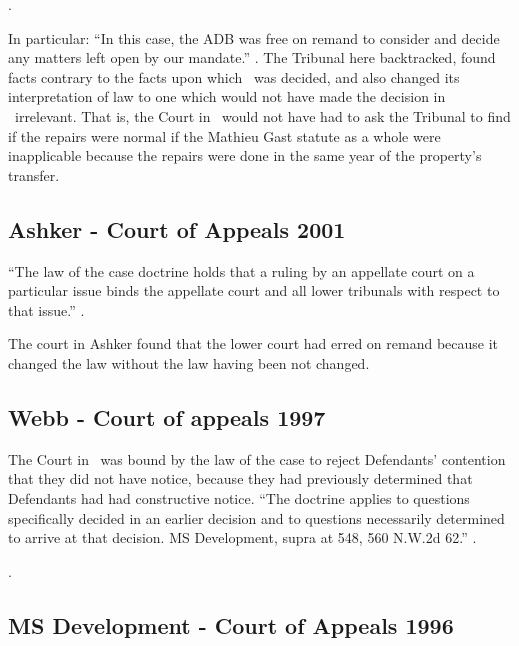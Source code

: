 \documentclass[12pt,\documentclassflag]{michiganCourtOfAppealsBrief}
\begin{document}
.

In particular: ``In this case, the ADB was free on remand to consider and decide any matters left open by our mandate.'' . The Tribunal here backtracked, found facts contrary to the facts upon which \cite{Patru 1}\ was decided, and also changed its interpretation of law to one which would not have made the decision in \cite{Patru 1}\ irrelevant. That is, the Court in \cite{Patru 1}\ would not have had to ask the Tribunal to find if the repairs were normal if the Mathieu Gast statute as a whole were inapplicable because the repairs were done in the same year of the property's transfer.


\subsection{Ashker - Court of Appeals 2001}
``The law of the case doctrine holds that a ruling by an appellate court on a particular issue binds the appellate court and all lower tribunals with respect to that issue.'' .

The court in Ashker found that the lower court had erred on remand because it changed the law without the law having been not changed.

\subsection{Webb - Court of appeals 1997}


The Court in \cite{Webb}\ was bound by the law of the case to reject Defendants' contention that they did not have notice, because they had previously determined that Defendants had had constructive notice. 
``The doctrine applies to questions specifically decided in an earlier decision and to questions necessarily determined to arrive at that decision. MS Development, supra at 548, 560 N.W.2d 62.'' .

\href{https://scholar.google.com/scholar_case?case=1161639175864759443&q=%22law+of+the+case%22&hl=en&as_sdt=4,23}{\cite{Webb}}.
  
\subsection{MS Development - Court of Appeals 1996}
\end{document}
